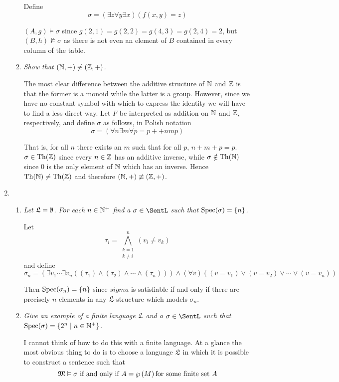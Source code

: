 \documentclass[10pt]{article}
\begin{document}
\begin{enumerate}
\begin{enumerate}
Define $$\sigma = (\exists z \forall y \exists x)(f(x,y) = z)$$

$(A,g) \vDash \sigma$ since $g(2,1) = g(2,2) = g(4,3) = g(2,4) = 2$, but $(B, h) \not\vDash \sigma$ as there is not even an element of $B$ contained in every column of the table.

\item \emph{Show that $(\mathbb{N}, +) \not\equiv (\mathbb{Z}, +)$.}

The most clear difference between the additive structure of $\mathbb{N}$ and $\mathbb{Z}$ is that the former is a monoid while the latter is a group.  However, since we have no constant symbol with which to express the identity we will have to find a less direct way.  Let $F$ be interpreted as addition on $\mathbb{N}$ and $\mathbb{Z}$, respectively, and define $\sigma$ as follows, in Polish notation
\[
\sigma = (\forall n \exists m \forall p = p ++nmp)
\]

That is, for all $n$ there exists an $m$ such that for all $p$, $n+m+p = p$.  $\sigma \in \operatorname{Th}(\mathbb{Z})$ since every $n \in \mathbb{Z}$ has an additive inverse, while $\sigma \notin \operatorname{Th}(\mathbb{N})$ since $0$ is the only element of $\mathbb{N}$ which has an inverse.  Hence $\operatorname{Th}(\mathbb{N}) \neq \operatorname{Th}(\mathbb{Z})$ and therefore $(\mathbb{N}, +) \not\equiv (\mathbb{Z}, +)$.
\end{enumerate}

\item
\begin{enumerate}
\item \emph{Let $\mathfrak{L} = \emptyset$.  For each $n \in \mathbb{N}^+$ find a $\sigma \in \SentL$ such that $\operatorname{Spec}(\sigma) = \left\{ n \right\}$.}

Let $$\tau_i = \bigwedge_{\substack{k=1 \\ k \neq i}}^n (v_i \neq v_k)$$ and define
\[
\sigma_n = (\exists v_1 \cdots \exists v_n ((\tau_1) \land (\tau_2) \land \cdots \land (\tau_n))) \land (\forall v)((v = v_1) \lor (v = v_2) \lor \cdots \lor (v = v_n))
\]

Then $\operatorname{Spec}(\sigma_n) = \left\{ n \right\}$ since $sigma$ is satisfiable if and only if there are precisely $n$ elements in any $\mathfrak{L}$-structure which models $\sigma_n$.

\item \emph{Give an example of a finite language $\mathfrak{L}$ and a $\sigma \in \SentL$ such that $\operatorname{Spec}(\sigma) = \left\{ 2^n \mid n \in \mathbb{N}^+ \right\}$.}

I cannot think of how to do this with a finite language.  At a glance the most obvious thing to do is to choose a language $\mathfrak{L}$ in which it is possible to construct a sentence such that
\[
\mathfrak{M} \vDash \sigma \mbox{ if and only if } A = \wp\left(M\right) \mbox{for some finite set $A$}
\]


\end{enumerate}
\end{enumerate}
\end{document}
